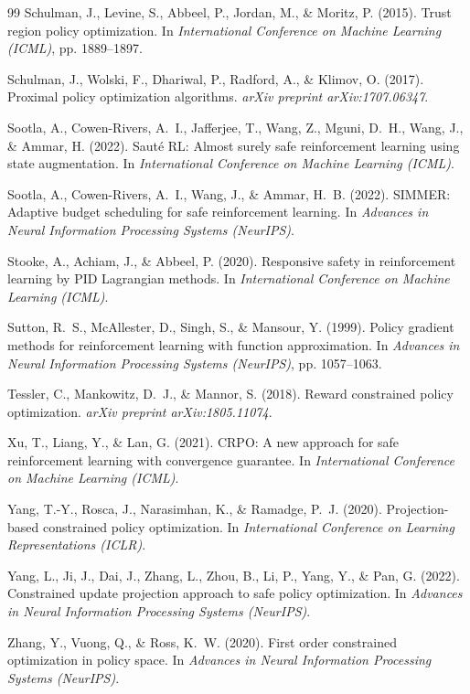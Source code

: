 \documentclass[12pt,a4paper]{article}
\theoremstyle{definition}
\begin{document}
\begin{thebibliography}{99}
Schulman, J., Levine, S., Abbeel, P., Jordan, M., \& Moritz, P. (2015).
\newblock Trust region policy optimization.
\newblock In \emph{International Conference on Machine Learning (ICML)}, pp. 1889--1897.

Schulman, J., Wolski, F., Dhariwal, P., Radford, A., \& Klimov, O. (2017).
\newblock Proximal policy optimization algorithms.
\newblock \emph{arXiv preprint arXiv:1707.06347}.

Sootla, A., Cowen-Rivers, A.~I., Jafferjee, T., Wang, Z., Mguni, D.~H., Wang, J., \& Ammar, H. (2022).
\newblock Saut{\'e} RL: Almost surely safe reinforcement learning using state augmentation.
\newblock In \emph{International Conference on Machine Learning (ICML)}.

Sootla, A., Cowen-Rivers, A.~I., Wang, J., \& Ammar, H.~B. (2022).
\newblock SIMMER: Adaptive budget scheduling for safe reinforcement learning.
\newblock In \emph{Advances in Neural Information Processing Systems (NeurIPS)}.

Stooke, A., Achiam, J., \& Abbeel, P. (2020).
\newblock Responsive safety in reinforcement learning by PID Lagrangian methods.
\newblock In \emph{International Conference on Machine Learning (ICML)}.

Sutton, R.~S., McAllester, D., Singh, S., \& Mansour, Y. (1999).
\newblock Policy gradient methods for reinforcement learning with function approximation.
\newblock In \emph{Advances in Neural Information Processing Systems (NeurIPS)}, pp. 1057--1063.

Tessler, C., Mankowitz, D.~J., \& Mannor, S. (2018).
\newblock Reward constrained policy optimization.
\newblock \emph{arXiv preprint arXiv:1805.11074}.

Xu, T., Liang, Y., \& Lan, G. (2021).
\newblock CRPO: A new approach for safe reinforcement learning with convergence guarantee.
\newblock In \emph{International Conference on Machine Learning (ICML)}.

Yang, T.-Y., Rosca, J., Narasimhan, K., \& Ramadge, P.~J. (2020).
\newblock Projection-based constrained policy optimization.
\newblock In \emph{International Conference on Learning Representations (ICLR)}.

Yang, L., Ji, J., Dai, J., Zhang, L., Zhou, B., Li, P., Yang, Y., \& Pan, G. (2022).
\newblock Constrained update projection approach to safe policy optimization.
\newblock In \emph{Advances in Neural Information Processing Systems (NeurIPS)}.

Zhang, Y., Vuong, Q., \& Ross, K.~W. (2020).
\newblock First order constrained optimization in policy space.
\newblock In \emph{Advances in Neural Information Processing Systems (NeurIPS)}.

\end{thebibliography}
\end{document}
